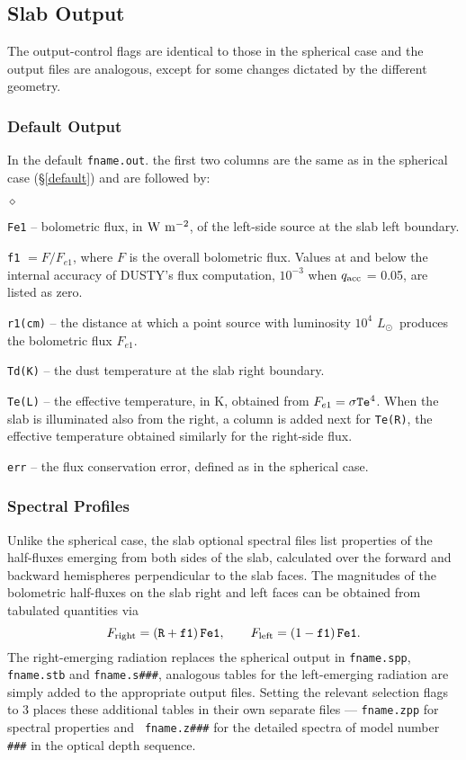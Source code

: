 \documentclass[12pt]{article} \usepackage{epsf}
\def\D  {{\sf DUSTY}}
\def\E#1{\hbox{$10^{#1}$}}
\def\Lo     {\hbox{$L_{\odot}$}}
\begin{document}
\subsection{Slab Output}
\label{Slab Output}

The output-control flags are identical to those in the spherical case and the
output files are analogous, except for some changes dictated by the different
geometry.

\subsubsection{Default Output}
In the default {\tt fname.out}. the first two columns are the same as in the
spherical case (\S\ref{default}) and are followed by:
\begin{list}{$\diamond$}{}
\item{\tt Fe1} --
bolometric flux, in $\rm W\ m^{-2}$, of the left-side source at the slab left
boundary.
\item{\tt f1} $= F/F_{e1}$, where $F$ is the overall bolometric flux.
Values at and below the internal accuracy of \D's flux computation, \E{-3} when
$q_{\rm acc}$ = 0.05, are listed as zero.
\item{\tt r1(cm)} -- the distance at which a point source with luminosity
\E4 \Lo\ produces the bolometric flux $F_{e1}$.
\item  {\tt Td(K)} -- the dust temperature at the slab right boundary.
\item
{\tt Te(L)} -- the effective temperature, in K, obtained from $F_{e1} =
\sigma{\tt Te}^4$.  When the slab is illuminated also from the right, a column
is added next for {\tt Te(R)}, the effective temperature obtained similarly for
the right-side flux.
\item{\tt err} -- the flux conservation error, defined as in the spherical case.

\end{list}

\subsubsection{Spectral Profiles}
Unlike the spherical case, the slab optional spectral files list properties of
the half-fluxes emerging from both sides of the slab, calculated over the
forward and backward hemispheres perpendicular to the slab faces.  The
magnitudes of the bolometric half-fluxes on the slab right and left faces can
be obtained from tabulated quantities via
 $$ F_{\rm right} = ({\tt R} + {\tt f1})\,{\tt Fe1}, \qquad
    F_{\rm left}  = (1 - {\tt f1})\,{\tt Fe1}. $$
The right-emerging radiation replaces the spherical output in {\tt fname.spp},
{\tt fname.stb} and {\tt fname.s\#\#\#}, analogous tables for the left-emerging
radiation are simply added to the appropriate output files. Setting the
relevant selection flags to 3 places these additional tables in their own
separate files --- {\tt fname.zpp} for spectral properties and {\tt
fname.z\#\#\#} for the detailed spectra of model number {\tt \#\#\#} in the
optical depth sequence.
\end{document}
